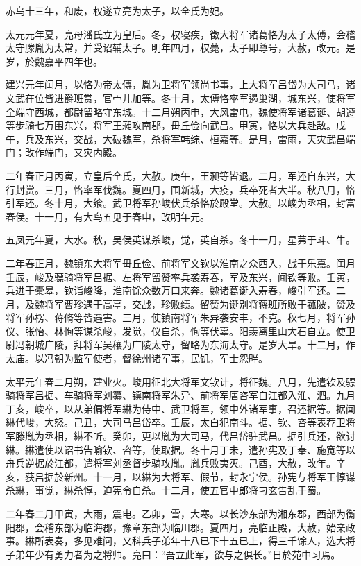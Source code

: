 \documentclass[12pt,UTF8]{ctexbook}
\begin{document}
赤乌十三年，和废，权遂立亮为太子，以全氏为妃。

太元元年夏，亮母潘氏立为皇后。冬，权寝疾，徵大将军诸葛恪为太子太傅，会稽太守滕胤为太常，并受诏辅太子。明年四月，权薨，太子即尊号，大赦，改元。是岁，於魏嘉平四年也。

建兴元年闰月，以恪为帝太傅，胤为卫将军领尚书事，上大将军吕岱为大司马，诸文武在位皆进爵班赏，官{宀儿}加等。冬十月，太傅恪率军遏巢湖，城东兴，使将军全端守西城，都尉留略守东城。十二月朔丙申，大风雷电，魏使将军诸葛诞、胡遵等步骑七万围东兴，将军王昶攻南郡，毌丘俭向武昌。甲寅，恪以大兵赴敌。戊午，兵及东兴，交战，大破魏军，杀将军韩综、桓嘉等。是月，雷雨，天灾武昌端门；改作端门，又灾内殿。

二年春正月丙寅，立皇后全氏，大赦。庚午，王昶等皆退。二月，军还自东兴，大行封赏。三月，恪率军伐魏。夏四月，围新城，大疫，兵卒死者大半。秋八月，恪引军还。冬十月，大飨。武卫将军孙峻伏兵杀恪於殿堂。大赦。以峻为丞相，封富春侯。十一月，有大鸟五见于春申，改明年元。

五凤元年夏，大水。秋，吴侯英谋杀峻，觉，英自杀。冬十一月，星茀于斗、牛。

二年春正月，魏镇东大将军毌丘俭、前将军文钦以淮南之众西入，战于乐嘉。闰月壬辰，峻及骠骑将军吕据、左将军留赞率兵袭寿春，军及东兴，闻钦等败。壬寅，兵进于橐皋，钦诣峻降，淮南馀众数万口来奔。魏诸葛诞入寿春，峻引军还。二月，及魏将军曹珍遇于高亭，交战，珍败绩。留赞为诞别将蒋班所败于菰陂，赞及将军孙楞、蒋脩等皆遇害。三月，使镇南将军朱异袭安丰，不克。秋七月，将军孙仪、张怡、林恂等谋杀峻，发觉，仪自杀，恂等伏辜。阳羡离里山大石自立。使卫尉冯朝城广陵，拜将军吴穰为广陵太守，留略为东海太守。是岁大旱。十二月，作太庙。以冯朝为监军使者，督徐州诸军事，民饥，军士怨畔。

太平元年春二月朔，建业火。峻用征北大将军文钦计，将征魏。八月，先遣钦及骠骑将军吕据、车骑将军刘纂、镇南将军朱异、前将军唐咨军自江都入淮、泗。九月丁亥，峻卒，以从弟偏将军綝为侍中、武卫将军，领中外诸军事，召还据等。据闻綝代峻，大怒。己丑，大司马吕岱卒。壬辰，太白犯南斗。据、钦、咨等表荐卫将军滕胤为丞相，綝不听。癸卯，更以胤为大司马，代吕岱驻武昌。据引兵还，欲讨綝。綝遣使以诏书告喻钦、咨等，使取据。冬十月丁未，遣孙宪及丁奉、施宽等以舟兵逆据於江都，遣将军刘丞督步骑攻胤。胤兵败夷灭。己酉，大赦，改年。辛亥，获吕据於新州。十一月，以綝为大将军、假节，封永宁侯。孙宪与将军王惇谋杀綝，事觉，綝杀惇，迫宪令自杀。十二月，使五官中郎将刁玄告乱于蜀。

二年春二月甲寅，大雨，震电。乙卯，雪，大寒。以长沙东部为湘东郡，西部为衡阳郡，会稽东部为临海郡，豫章东部为临川郡。夏四月，亮临正殿，大赦，始亲政事。綝所表奏，多见难问，又科兵子弟年十八已下十五已上，得三千馀人，选大将子弟年少有勇力者为之将帅。亮曰：“吾立此军，欲与之俱长。”日於苑中习焉。
\end{document}
